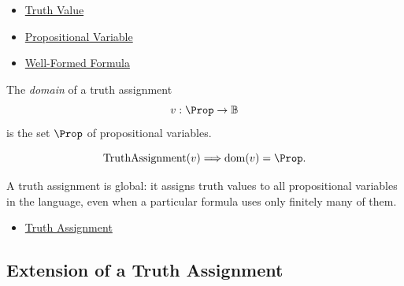 \begin{dependencies}
\begin{itemize}
  \item \hyperref[def:truth-value-propositional-logic]{Truth Value}
  \item \hyperref[def:propositional-variable]{Propositional Variable}
  \item \hyperref[def:well-formed-formula]{Well-Formed Formula}
\end{itemize}
\end{dependencies}

\begin{tcolorbox}[colback=propbox, colframe=propborder, arc=2pt,
  left=6pt, right=6pt, top=4pt, bottom=4pt,
  title={\small\textbf{Definition (Domain of a Truth Assignment)}},
  fonttitle=\small\bfseries]
\begin{definition}
\label{def:truth-assignment-domain-propositional-logic}
The \emph{domain} of a truth assignment
\[
v:\Prop\to\mathbb{B}
\]
is the set \(\Prop\) of propositional variables.
\end{definition}
\end{tcolorbox}

\begin{remark*}
\[
\operatorname{TruthAssignment}(v)\Longrightarrow \operatorname{dom}(v)=\Prop.
\]
\end{remark*}

\begin{remark*}[Interpretation]
A truth assignment is global: it assigns truth values to all propositional
variables in the language, even when a particular formula uses only finitely many
of them.
\end{remark*}

\begin{dependencies}
\begin{itemize}
  \item \hyperref[def:truth-assignment-propositional-logic]{Truth Assignment}
\end{itemize}
\end{dependencies}

\subsection*{Extension of a Truth Assignment}
\label{subsec:extension-of-truth-assignment-propositional-logic}

